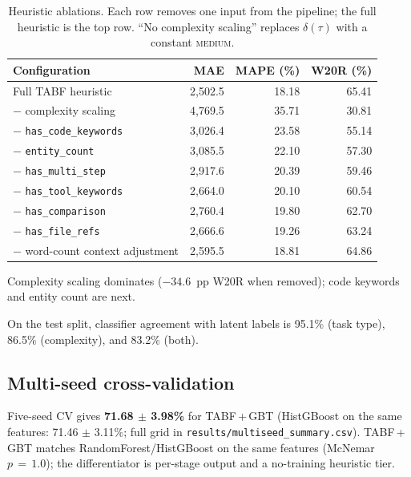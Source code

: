 \documentclass{article}
\newcommand{\code}[1]{\texttt{\small #1}}
\begin{document}
\begin{table}[h]
  \caption{Heuristic ablations. Each row removes one input from the
  pipeline; the full heuristic is the top row. ``No complexity
  scaling'' replaces $\delta(\tau)$ with a constant
  \textsc{medium}.}
  \label{tab:ablation}
  \centering
  \small
  \begin{tabular}{lrrr}
    \toprule
    Configuration & MAE & MAPE (\%) & W20R (\%) \\
    \midrule
    Full TABF heuristic            & 2{,}502.5 & 18.18 & 65.41 \\
    \quad $-$ complexity scaling   & 4{,}769.5 & 35.71 & 30.81 \\
    \quad $-$ \code{has\_code\_keywords}      & 3{,}026.4 & 23.58 & 55.14 \\
    \quad $-$ \code{entity\_count}            & 3{,}085.5 & 22.10 & 57.30 \\
    \quad $-$ \code{has\_multi\_step}         & 2{,}917.6 & 20.39 & 59.46 \\
    \quad $-$ \code{has\_tool\_keywords}      & 2{,}664.0 & 20.10 & 60.54 \\
    \quad $-$ \code{has\_comparison}          & 2{,}760.4 & 19.80 & 62.70 \\
    \quad $-$ \code{has\_file\_refs}          & 2{,}666.6 & 19.26 & 63.24 \\
    \quad $-$ word-count context adjustment   & 2{,}595.5 & 18.81 & 64.86 \\
    \bottomrule
  \end{tabular}
\end{table}

Complexity scaling dominates ($-34.6$~pp W20R when removed); code keywords
and entity count are next.

On the test split, classifier agreement with latent labels is 95.1\%
(task type), 86.5\% (complexity), and 83.2\% (both).

\subsection{Multi-seed cross-validation}
\label{sec:multiseed}

Five-seed CV gives \textbf{71.68 $\pm$ 3.98\%} for TABF\,+\,GBT
(HistGBoost on the same features: 71.46 $\pm$ 3.11\%; full grid in
\code{results/multiseed\_summary.csv}).
TABF\,+\,GBT matches RandomForest/HistGBoost on the same features
(McNemar $p\,{=}\,1.0$); the differentiator is per-stage output and a
no-training heuristic tier.
\end{document}
